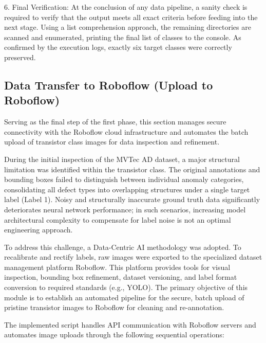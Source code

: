 \documentclass{article}
\begin{document}
\vspace{0.3cm}
6. Final Verification:
At the conclusion of any data pipeline, a sanity check is required to verify that the output meets all exact criteria before feeding into the next stage. Using a list comprehension approach, the remaining directories are scanned and enumerated, printing the final list of classes to the console. As confirmed by the execution logs, exactly six target classes were correctly preserved.

\subsection{Data Transfer to Roboflow (Upload to Roboflow)}

Serving as the final step of the first phase, this section manages secure connectivity with the Roboflow cloud infrastructure and automates the batch upload of transistor class images for data inspection and refinement.

During the initial inspection of the MVTec AD dataset, a major structural limitation was identified within the transistor class. The original annotations and bounding boxes failed to distinguish between individual anomaly categories, consolidating all defect types into overlapping structures under a single target label (Label 1). Noisy and structurally inaccurate ground truth data significantly deteriorates neural network performance; in such scenarios, increasing model architectural complexity to compensate for label noise is not an optimal engineering approach.

To address this challenge, a Data-Centric AI methodology was adopted. To recalibrate and rectify labels, raw images were exported to the specialized dataset management platform Roboflow. This platform provides tools for visual inspection, bounding box refinement, dataset versioning, and label format conversion to required standards (e.g., YOLO). The primary objective of this module is to establish an automated pipeline for the secure, batch upload of pristine transistor images to Roboflow for cleaning and re-annotation.

The implemented script handles API communication with Roboflow servers and automates image uploads through the following sequential operations:
\end{document}
